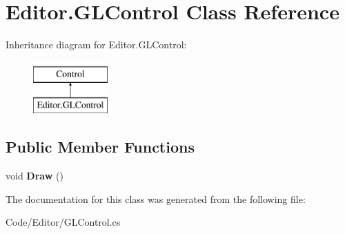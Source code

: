 \hypertarget{class_editor_1_1_g_l_control}{}\section{Editor.\+G\+L\+Control Class Reference}
\label{class_editor_1_1_g_l_control}
Inheritance diagram for Editor.\+G\+L\+Control\+:\begin{figure}[H]
\begin{center}
\leavevmode
\includegraphics[height=2.000000cm]{class_editor_1_1_g_l_control}
\end{center}
\end{figure}
\subsection*{Public Member Functions}
\begin{DoxyCompactItemize}
\item 
void {\bfseries Draw} ()\hypertarget{class_editor_1_1_g_l_control_aba9a36eab568a716ac0d6da09d24ad7b}{}\label{class_editor_1_1_g_l_control_aba9a36eab568a716ac0d6da09d24ad7b}

\end{DoxyCompactItemize}


The documentation for this class was generated from the following file\+:\begin{DoxyCompactItemize}
\item 
Code/\+Editor/G\+L\+Control.\+cs\end{DoxyCompactItemize}
